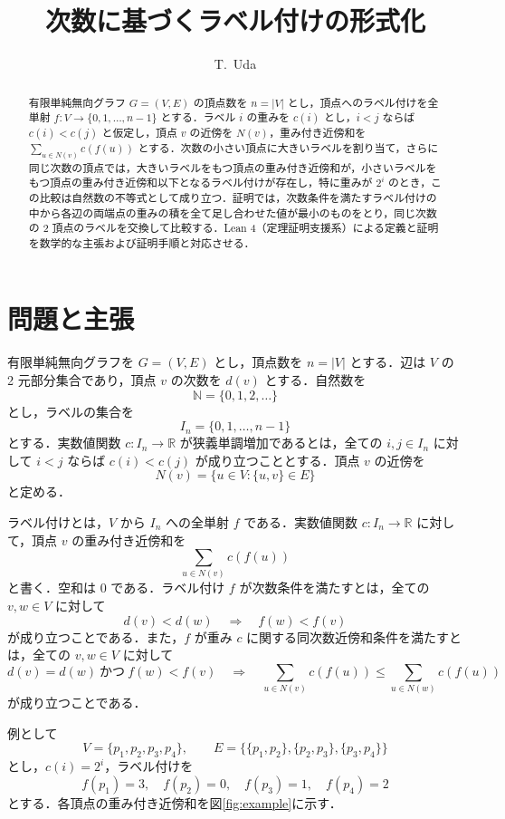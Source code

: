 \documentclass[lualatex,article]{jlreq}
\title{次数に基づくラベル付けの形式化}
\author{T.~Uda}
\date{}
\theoremstyle{jremark}
\begin{document}
\maketitle

\begin{abstract}
有限単純無向グラフ $G=(V,E)$ の頂点数を $n=|V|$ とし，頂点へのラベル付けを全単射 $f:V\to\{0,1,\ldots,n-1\}$ とする．ラベル $i$ の重みを $c(i)$ とし，$i<j$ ならば $c(i)<c(j)$ と仮定し，頂点 $v$ の近傍を $N(v)$，重み付き近傍和を $\sum_{u\in N(v)}c(f(u))$ とする．次数の小さい頂点に大きいラベルを割り当て，さらに同じ次数の頂点では，大きいラベルをもつ頂点の重み付き近傍和が，小さいラベルをもつ頂点の重み付き近傍和以下となるラベル付けが存在し，特に重みが $2^i$ のとき，この比較は自然数の不等式として成り立つ．証明では，次数条件を満たすラベル付けの中から各辺の両端点の重みの積を全て足し合わせた値が最小のものをとり，同じ次数の 2 頂点のラベルを交換して比較する．Lean 4（定理証明支援系）による定義と証明を数学的な主張および証明手順と対応させる．
\end{abstract}

\section{問題と主張}

有限単純無向グラフを $G=(V,E)$ とし，頂点数を $n=|V|$ とする．辺は $V$ の 2 元部分集合であり，頂点 $v$ の次数を $d(v)$ とする．自然数を
\[
  \mathbb N=\{0,1,2,\ldots\}
\]
とし，ラベルの集合を
\[
  I_n=\{0,1,\ldots,n-1\}
\]
とする．実数値関数 $c:I_n\to\mathbb R$ が狭義単調増加であるとは，全ての $i,j\in I_n$ に対して $i<j$ ならば $c(i)<c(j)$ が成り立つこととする．頂点 $v$ の近傍を
\[
  N(v)=\{u\in V:\{u,v\}\in E\}
\]
と定める．

ラベル付けとは，$V$ から $I_n$ への全単射 $f$ である．実数値関数 $c:I_n\to\mathbb R$ に対して，頂点 $v$ の重み付き近傍和を
\[
  \sum_{u\in N(v)}c(f(u))
\]
と書く．空和は $0$ である．ラベル付け $f$ が次数条件を満たすとは，全ての $v,w\in V$ に対して
\[
  d(v)<d(w)\quad\Longrightarrow\quad f(w)<f(v)
  \tag{1}\label{eq:degree-order}
\]
が成り立つことである．また，$f$ が重み $c$ に関する同次数近傍和条件を満たすとは，全ての $v,w\in V$ に対して
\[
  d(v)=d(w)\ \text{かつ}\ f(w)<f(v)
  \quad\Longrightarrow\quad
  \sum_{u\in N(v)}c(f(u))\leq\sum_{u\in N(w)}c(f(u))
  \tag{2}\label{eq:neighbour-order}
\]
が成り立つことである．

例として
\[
  V=\{p_1,p_2,p_3,p_4\},\qquad
  E=\{\{p_1,p_2\},\{p_2,p_3\},\{p_3,p_4\}\}
\]
とし，$c(i)=2^i$，ラベル付けを
\[
  f(p_1)=3,\quad f(p_2)=0,\quad f(p_3)=1,\quad f(p_4)=2
\]
とする．各頂点の重み付き近傍和を図\ref{fig:example}に示す．
\end{document}
